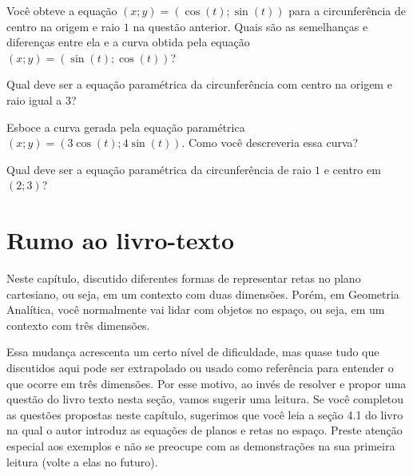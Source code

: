 \documentclass[main.tex]{subfiles}
\begin{document}
\begin{questao}
Você obteve a equação $(x;y)=(\cos(t);\sin(t))$ para a circunferência de centro na origem e raio $1$ na questão anterior. Quais são as semelhanças e diferenças entre ela e a curva obtida pela equação $(x;y)=(\sin(t);\cos(t))$?
\end{questao}


\begin{questao}
Qual deve ser a equação paramétrica da circunferência com centro na origem e raio igual a $3$?
\end{questao}


\begin{questao}
Esboce a curva gerada pela equação paramétrica $(x;y)=(3\cos(t);4\sin(t))$. Como você descreveria essa curva?
\end{questao}


\begin{questao}
Qual deve ser a equação paramétrica da circunferência de raio $1$ e centro em $(2;3)$?
\end{questao}


\section{Rumo ao livro-texto}

Neste capítulo, discutido diferentes formas de representar retas no plano cartesiano, ou seja, em um contexto com duas dimensões. Porém, em Geometria Analítica, você normalmente vai lidar com objetos no espaço, ou seja, em um contexto com três dimensões.

Essa mudança acrescenta um certo nível de dificuldade, mas quase tudo que discutidos aqui pode ser extrapolado ou usado como referência para entender o que ocorre em três dimensões. Por esse motivo, ao invés de resolver e propor uma questão do livro texto nesta seção, vamos sugerir uma leitura. Se você completou as questões propostas neste capítulo, sugerimos que você leia a seção 4.1 do livro  na qual o autor introduz as equações de planos e retas no espaço. Preste atenção especial aos exemplos e não se preocupe com as demonstrações na sua primeira leitura (volte a elas no futuro).
\end{document}
